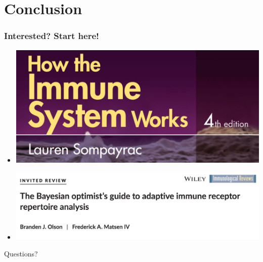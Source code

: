 \documentclass[mathserif,compress]{beamer}
\renewcommand\;{\,}
\begin{document}
\section{Conclusion}

\begin{frame}\frametitle{Interested? Start here!}
\begin{itemize}
\item[]
\begin{center}
\includegraphics[width=0.8 \linewidth]{Images/Sompayrac.png}
\end{center}
\bigskip
\item[]
\begin{center}
\includegraphics[width=\linewidth]{Images/Optimist.png}
\end{center}
\end{itemize}
\end{frame}

\begin{frame}
\begin{center}
\large
Questions?
\end{center}
\end{frame}
\end{document}
